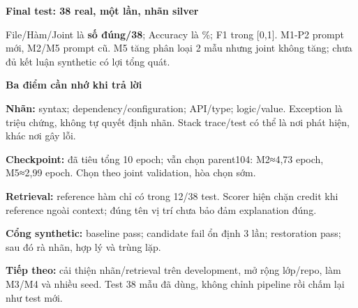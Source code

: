 \documentclass[10pt,a4paper]{article}
\begin{document}
\medskip\textbf{Final test: 38 real, một lần, nhãn silver}\par
\begin{center}\end{center}
File/Hàm/Joint là \textbf{số đúng/38}; Accuracy là \%; F1 trong [0,1]. M1-P2 prompt mới, M2/M5 prompt cũ. M5 tăng phân loại 2 mẫu nhưng joint không tăng; chưa đủ kết luận synthetic có lợi tổng quát.

\textbf{Ba điểm cần nhớ khi trả lời}\par
\textbf{Nhãn:} syntax; dependency/configuration; API/type; logic/value. Exception là triệu chứng, không tự quyết định nhãn. Stack trace/test có thể là nơi phát hiện, khác nơi gây lỗi.\par
\textbf{Checkpoint:} đã tiêu tổng 10 epoch; vẫn chọn parent104: M2≈4,73 epoch, M5≈2,99 epoch. Chọn theo joint validation, hòa chọn sớm.\par
\textbf{Retrieval:} reference hàm chỉ có trong 12/38 test. Scorer hiện chặn credit khi reference ngoài context; đúng tên vị trí chưa bảo đảm explanation đúng.

\textbf{Cổng synthetic:} baseline pass; candidate fail ổn định 3 lần; restoration pass; sau đó rà nhãn, hợp lý và trùng lặp.\par
\textbf{Tiếp theo:} cải thiện nhãn/retrieval trên development, mở rộng lớp/repo, làm M3/M4 và nhiều seed. Test 38 mẫu đã dùng, không chỉnh pipeline rồi chấm lại như test mới.
\end{document}
